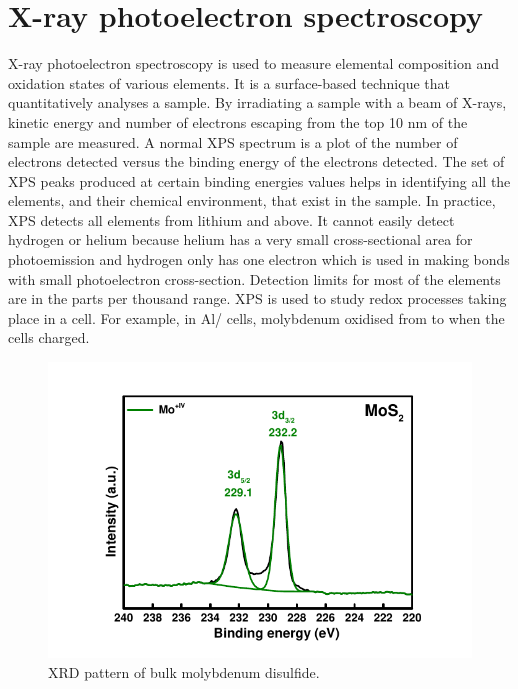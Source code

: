 \section{X-ray photoelectron spectroscopy}
 X-ray photoelectron spectroscopy is used to measure elemental composition and oxidation states of various elements. It is a surface-based technique that quantitatively analyses a sample. By irradiating a sample with a beam of X-rays, kinetic energy and number of electrons escaping from the top 10 nm of the sample are measured. 
A normal XPS spectrum is a plot of the number of electrons detected versus the binding energy of the electrons detected. The set of XPS peaks produced at certain binding energies values helps in identifying all the elements, and their chemical environment, that exist in the sample. 
In practice, XPS detects all elements from lithium and above. It cannot easily detect hydrogen or helium because helium has a very small cross-sectional area for photoemission and hydrogen only has one electron which is used in making bonds with  small photoelectron cross-section. Detection limits for most of the elements are in the parts per thousand range. XPS is used to study redox processes taking place in a cell. For example, in Al/ cells, molybdenum oxidised from  to  when the cells charged. 

\begin{figure}[tbh!]
\centering
\includegraphics[width=\textwidth]{Figures/chap2fig/XPS}
\caption{XRD pattern of bulk molybdenum disulfide.}
\label{Figures/chap2fig:XPS}
\end{figure}

